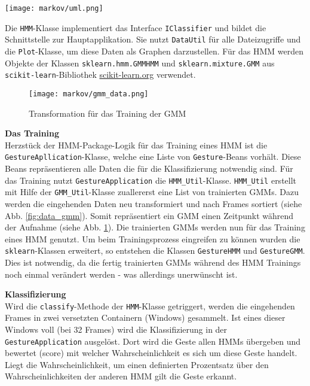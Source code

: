 \begin{figure*}[htbp] \centering
    \texttt{[image: markov/uml.png]}
    \caption{Klassendiagram und Abhängigkeiten des \acl{HMM} Klassifikators}
    \label{fig:uml}
\end{figure*}


Die \texttt{HMM}-Klasse implementiert das Interface \texttt{IClassifier} und
bildet die Schnittstelle zur Hauptapplikation. Sie nutzt \texttt{DataUtil} für
alle Dateizugriffe und die \texttt{Plot}-Klasse, um diese Daten als Graphen
darzustellen. 
Für das \acl{HMM} werden Objekte der Klassen \texttt{sklearn.hmm.GMMHMM} und
\texttt{sklearn.mixture.GMM} aus \texttt{scikit-learn}-Bibliothek
\url{scikit-learn.org} verwendet.


\begin{figure}[htbp] \centering
    \texttt{[image: markov/gmm\_data.png]}
    \caption{Transformation für das Training der \acl{GMM}}
    \label{fig:gmm_data}
\end{figure}


\textbf{Das Training} \\
Herzstück der HMM-Package-Logik für das Training eines \acl{HMM} ist die
\texttt{GestureApllication}-Klasse, welche eine Liste von \texttt{Gesture}-Beans vorhält.
Diese Beans repräsentieren alle Daten die für die Klassifizierung notwendig
sind. Für das Training nutzt \texttt{GestureApplication} die
\texttt{HMM\_Util}-Klasse.
\texttt{HMM\_Util} erstellt mit Hilfe der \texttt{GMM\_Util}-Klasse zuallererst
eine List von trainierten \acl{GMM}s. Dazu werden die eingehenden Daten neu
transformiert und nach Frames sortiert (siehe Abb. \ref{fig:data_gmm}). Somit
repräsentiert ein \acl{GMM} einen Zeitpunkt während der Aufnahme (siehe Abb.
\ref{fig:gmm_data}). Die trainierten \acl{GMM}s werden nun für das Training
eines \acl{HMM} genutzt. Um beim Trainingsprozess eingreifen zu können wurden
die \texttt{sklearn}-Klassen erweitert, so entstehen die Klassen
\texttt{GestureHMM} und \texttt{GestureGMM}. Dies ist notwendig, da die fertig
trainierten \acl{GMM}s während des \acl{HMM} Trainings noch einmal verändert
werden - was allerdings unerwünscht ist.


\textbf{Klassifizierung} \\
Wird die \texttt{classify}-Methode der \texttt{HMM}-Klasse getriggert, werden die eingehenden Frames in zwei versetzten Containern (Windows) gesammelt.
Ist eines dieser Windows voll (bei 32 Frames) wird die Klassifizierung in der \texttt{GestureApplication} ausgelöst. Dort wird die Geste allen \acl{HMM}s übergeben und
bewertet (score) mit welcher Wahrscheinlichkeit es sich um diese Geste handelt. Liegt die Wahrscheinlichkeit, um einen definierten Prozentsatz über den Wahrscheinlichkeiten
der anderen \acl{HMM} gilt die Geste erkannt.

